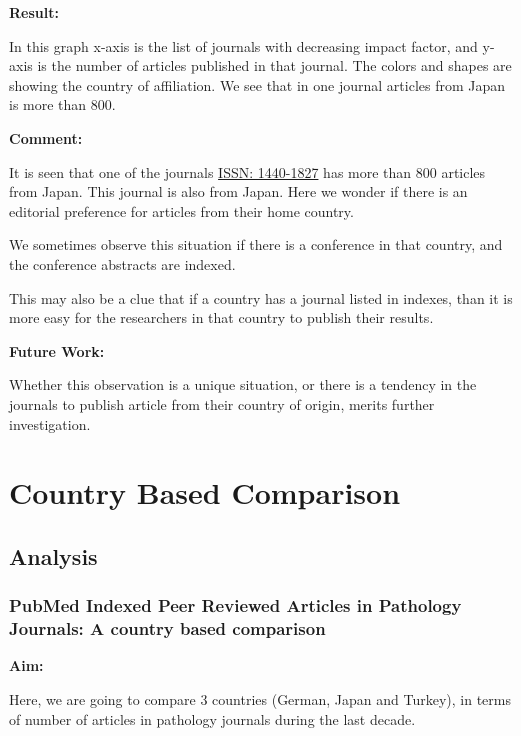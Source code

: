 \documentclass[
]{book}
\begin{document}
\textbf{Result:}

In this graph x-axis is the list of journals with decreasing impact factor, and y-axis is the number of articles published in that journal. The colors and shapes are showing the country of affiliation. We see that in one journal articles from Japan is more than 800.

\textbf{Comment:}

It is seen that one of the journals \href{https://onlinelibrary.wiley.com/page/journal/14401827/homepage/productinformation.html}{ISSN: 1440-1827} has more than 800 articles from Japan. This journal is also from Japan. Here we wonder if there is an editorial preference for articles from their home country.

We sometimes observe this situation if there is a conference in that country, and the conference abstracts are indexed.

This may also be a clue that if a country has a journal listed in indexes, than it is more easy for the researchers in that country to publish their results.

\textbf{Future Work:}

Whether this observation is a unique situation, or there is a tendency in the journals to publish article from their country of origin, merits further investigation.

\hypertarget{country-based-comparison}{%
\chapter{Country Based Comparison}\label{country-based-comparison}}

\hypertarget{analysis-1}{%
\section{Analysis}\label{analysis-1}}

\hypertarget{pubmed-indexed-peer-reviewed-articles-in-pathology-journals-a-country-based-comparison}{%
\subsection{PubMed Indexed Peer Reviewed Articles in Pathology Journals: A country based comparison}\label{pubmed-indexed-peer-reviewed-articles-in-pathology-journals-a-country-based-comparison}}

\textbf{Aim:}

Here, we are going to compare 3 countries (German, Japan and Turkey), in terms of number of articles in pathology journals during the last decade.
\end{document}
